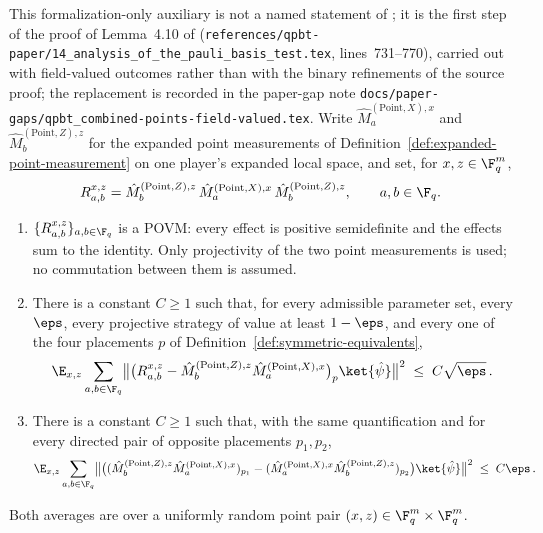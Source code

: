 \begin{lemma}
	\label{lem:qld-sandwich-povm}
	\leanok
	This formalization-only auxiliary is not a named statement of
	\cite{Ji2020MIPStar}; it is the first step of the proof of Lemma~4.10 of
	\cite{Ji2020MIPStar}
	(\texttt{references/qpbt-paper/14\_analysis\_of\_the\_pauli\_basis\_test.tex},
	lines~731--770), carried out with field-valued outcomes rather than with
	the binary refinements of the source proof; the replacement is recorded in
	the paper-gap note
	\texttt{docs/paper-gaps/qpbt\_combined-points-field-valued.tex}.
	Write $\hat{M}^{(\mathrm{Point},X),x}_{a}$ and
	$\hat{M}^{(\mathrm{Point},Z),z}_{b}$ for the expanded point measurements
	of Definition~\ref{def:expanded-point-measurement} on one player's
	expanded local space, and set, for $x, z \in \F_q^m$,
	\[
		R^{x,z}_{a,b}
		= \hat{M}^{(\mathrm{Point},Z),z}_{b}\,
		\hat{M}^{(\mathrm{Point},X),x}_{a}\,
		\hat{M}^{(\mathrm{Point},Z),z}_{b},
		\qquad a, b \in \F_q .
	\]
	\begin{enumerate}
		\item $\{R^{x,z}_{a,b}\}_{a,b \in \F_q}$ is a POVM: every effect is
		positive semidefinite and the effects sum to the identity. Only
		projectivity of the two point measurements is used; no commutation
		between them is assumed.
		\item There is a constant $C \ge 1$ such that, for every admissible
		parameter set, every $\eps$, every projective strategy of value at
		least $1-\eps$, and every one of the four placements $p$ of
		Definition~\ref{def:symmetric-equivalents},
		\[
			\E_{x,z} \sum_{a,b \in \F_q}
			\bigl\lVert \bigl(R^{x,z}_{a,b}
			- \hat{M}^{(\mathrm{Point},Z),z}_{b}
			\hat{M}^{(\mathrm{Point},X),x}_{a}\bigr)_{p}
			\ket{\hat\psi} \bigr\rVert^2
			\;\le\; C \sqrt{\eps}\,.
		\]
		\item There is a constant $C \ge 1$ such that, with the same
		quantification and for every directed pair of opposite placements
		$p_1, p_2$,
		\[
			\E_{x,z} \sum_{a,b \in \F_q}
			\bigl\lVert \bigl(
			(\hat{M}^{(\mathrm{Point},Z),z}_{b}
			\hat{M}^{(\mathrm{Point},X),x}_{a})_{p_1}
			- (\hat{M}^{(\mathrm{Point},X),x}_{a}
			\hat{M}^{(\mathrm{Point},Z),z}_{b})_{p_2}
			\bigr) \ket{\hat\psi} \bigr\rVert^2
			\;\le\; C \eps\,.
		\]
	\end{enumerate}
	Both averages are over a uniformly random point pair
	$(x,z) \in \F_q^m \times \F_q^m$.
\end{lemma}
